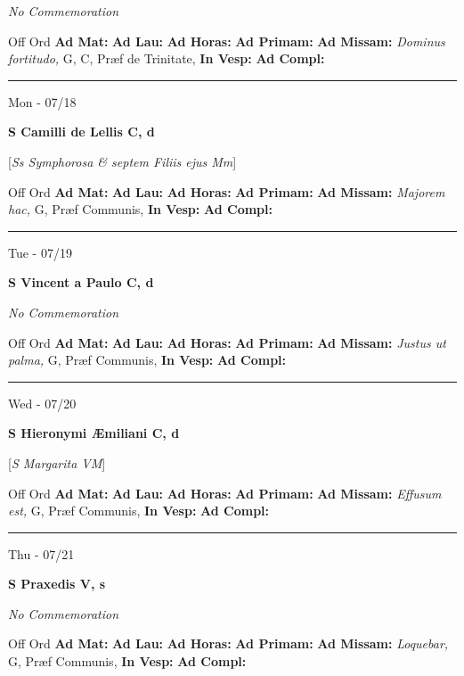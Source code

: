 \documentclass[letterpaper, 10pt]{article}
\begin{document}
\textit{No Commemoration}\begin{justify}
Off Ord
\textbf{Ad Mat: }
\textbf{Ad Lau: }
\textbf{Ad Horas: }
\textbf{Ad Primam: }
\textbf{Ad Missam:} \textit{Dominus fortitudo, } G, C, Præf de Trinitate, 
\textbf{In Vesp: }
\textbf{Ad Compl: }\end{justify}



\hrule
\begin{center}
Mon - 07/18
\end{center}\textbf{ \large S Camilli de Lellis C, \textnormal{\normalsize d}}

[\textit{Ss Symphorosa \& septem Filiis ejus Mm}]
\begin{justify}
Off Ord
\textbf{Ad Mat: }
\textbf{Ad Lau: }
\textbf{Ad Horas: }
\textbf{Ad Primam: }
\textbf{Ad Missam:} \textit{Majorem hac, } G, Præf Communis, 
\textbf{In Vesp: }
\textbf{Ad Compl: }\end{justify}



\hrule
\begin{center}
Tue - 07/19
\end{center}\textbf{ \large S Vincent a Paulo C, \textnormal{\normalsize d}}

\textit{No Commemoration}\begin{justify}
Off Ord
\textbf{Ad Mat: }
\textbf{Ad Lau: }
\textbf{Ad Horas: }
\textbf{Ad Primam: }
\textbf{Ad Missam:} \textit{Justus ut palma, } G, Præf Communis, 
\textbf{In Vesp: }
\textbf{Ad Compl: }\end{justify}



\hrule
\begin{center}
Wed - 07/20
\end{center}\textbf{ \large S Hieronymi Æmiliani C, \textnormal{\normalsize d}}

[\textit{S Margarita VM}]
\begin{justify}
Off Ord
\textbf{Ad Mat: }
\textbf{Ad Lau: }
\textbf{Ad Horas: }
\textbf{Ad Primam: }
\textbf{Ad Missam:} \textit{Effusum est, } G, Præf Communis, 
\textbf{In Vesp: }
\textbf{Ad Compl: }\end{justify}



\hrule
\begin{center}
Thu - 07/21
\end{center}\textbf{ \large S Praxedis V, \textnormal{\normalsize s}}

\textit{No Commemoration}\begin{justify}
Off Ord
\textbf{Ad Mat: }
\textbf{Ad Lau: }
\textbf{Ad Horas: }
\textbf{Ad Primam: }
\textbf{Ad Missam:} \textit{Loquebar, } G, Præf Communis, 
\textbf{In Vesp: }
\textbf{Ad Compl: }\end{justify}
\end{document}

